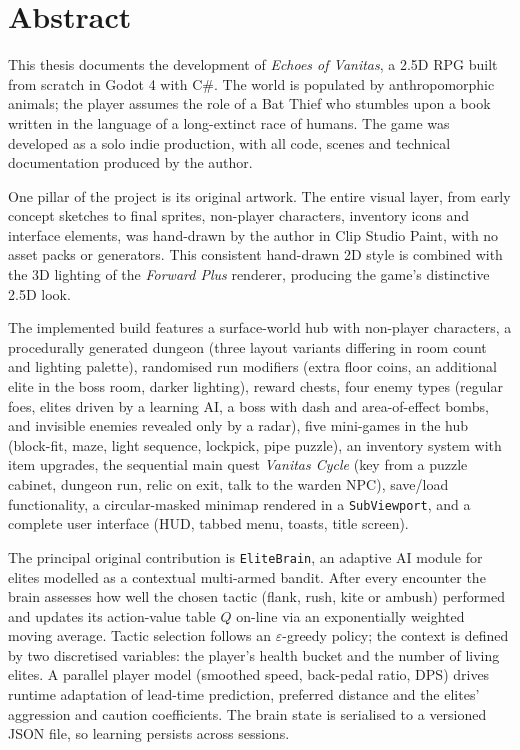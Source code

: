 
\section*{Abstract}
This thesis documents the development of \textit{Echoes of Vanitas}, a 2.5D RPG built from scratch in Godot 4 with C\#. The world is populated by anthropomorphic animals; the player assumes the role of a Bat Thief who stumbles upon a book written in the language of a long-extinct race of humans. The game was developed as a solo indie production, with all code, scenes and technical documentation produced by the author.

One pillar of the project is its original artwork. The entire visual layer, from early concept sketches to final sprites, non-player characters, inventory icons and interface elements, was hand-drawn by the author in Clip Studio Paint, with no asset packs or generators. This consistent hand-drawn 2D style is combined with the 3D lighting of the \textit{Forward Plus} renderer, producing the game's distinctive 2.5D look.

The implemented build features a surface-world hub with non-player characters, a procedurally generated dungeon (three layout variants differing in room count and lighting palette), randomised run modifiers (extra floor coins, an additional elite in the boss room, darker lighting), reward chests, four enemy types (regular foes, elites driven by a learning AI, a boss with dash and area-of-effect bombs, and invisible enemies revealed only by a radar), five mini-games in the hub (block-fit, maze, light sequence, lockpick, pipe puzzle), an inventory system with item upgrades, the sequential main quest \textit{Vanitas Cycle} (key from a puzzle cabinet, dungeon run, relic on exit, talk to the warden NPC), save/load functionality, a circular-masked minimap rendered in a \texttt{SubViewport}, and a complete user interface (HUD, tabbed menu, toasts, title screen).

The principal original contribution is \texttt{EliteBrain}, an adaptive AI module for elites modelled as a contextual multi-armed bandit. After every encounter the brain assesses how well the chosen tactic (flank, rush, kite or ambush) performed and updates its action-value table $Q$ on-line via an exponentially weighted moving average. Tactic selection follows an $\varepsilon$-greedy policy; the context is defined by two discretised variables: the player's health bucket and the number of living elites. A parallel player model (smoothed speed, back-pedal ratio, DPS) drives runtime adaptation of lead-time prediction, preferred distance and the elites' aggression and caution coefficients. The brain state is serialised to a versioned JSON file, so learning persists across sessions.

